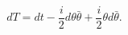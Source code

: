 \begin{equation}\label{dT}
  dT=dt-\frac{i}{2}d{\theta}\bar \theta
+\frac{i}{2}{\theta}d\bar\theta.
\end{equation}

